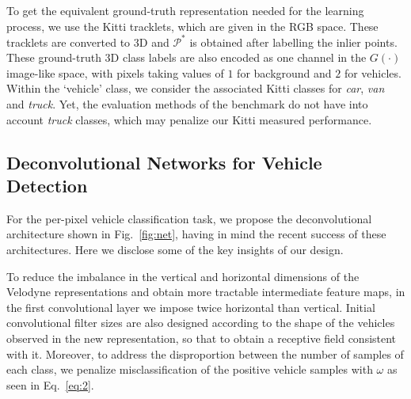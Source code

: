 \documentclass[letterpaper, 10 pt, conference]{ieeeconf}  %
\begin{document}
To get the equivalent ground-truth representation needed for the learning process, we use the Kitti tracklets, which are given in the RGB space. These tracklets are converted to 3D and $\mathcal{P^*}$ is obtained after labelling the inlier points. These ground-truth 3D class labels are also encoded as one channel in the $G(\cdot)$ image-like space, with pixels taking values of $1$ for background and $2$ for vehicles. Within the `vehicle' class, we consider the associated Kitti classes for \textit{car}, \textit{van} and \textit{truck}. Yet,  the evaluation methods of the benchmark do not have into account \textit{truck} classes, which may penalize our Kitti measured performance. 

\subsection{Deconvolutional Networks for Vehicle Detection}\label{sec:net}%
For the per-pixel vehicle classification task, we propose the deconvolutional architecture shown in Fig.~\ref{fig:net}, having in mind the recent success of these architectures. Here we disclose some of the key insights of our design. 

To reduce the imbalance in the vertical and horizontal dimensions of the Velodyne representations and obtain more tractable intermediate feature maps, in the first convolutional layer we impose twice horizontal than vertical. %
Initial convolutional filter sizes are also designed according to the shape of the vehicles observed in the new representation, so that to obtain a receptive field consistent with it.
Moreover, to address the disproportion between the number of samples of each class, we penalize misclassification of the positive vehicle samples with $\omega$ as seen in Eq.~\ref{eq:2}.
\end{document}
